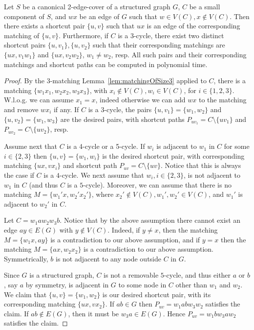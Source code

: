 \documentclass{article}
\begin{document}
\begin{lemma}\label{lem:shortcutPair}
    Let $S$ be a canonical 2-edge-cover of a structured graph $G$, $C$ be a small component of $S$, and $wx$ be an edge of $G$ such that $w\in V(C), x\notin V(C)$. Then there exists a shortcut pair $\{u, v\}$ such that $ux$ is an edge of the corresponding matching of $\{u, v\}$. Furthermore, if $C$ is a 3-cycle, there exist two distinct shortcut pairs $\{u, v_1\}, \{u, v_2\}$ such that their corresponding matchings are $\{ux, v_1w_1\}$ and $\{ux, v_2w_2\}$, $w_1\neq w_2$, resp. All such pairs and their corresponding matchings and shortcut paths can be computed in polynomial time.
\end{lemma}
\begin{proof}
    By the 3-matching Lemma~\ref{lem:matchingOfSize3} applied to $C$, there is a matching $\{w_1x_1, w_2x_2, w_3x_3\}$, with $x_i\notin V(C), w_i\in V(C)$, for $i\in\{1, 2, 3\}$. W.l.o.g. we can assume $x_1=x$, indeed otherwise we can add $wx$ to the matching and remove $wx_i$ if any. If $C$ is a 3-cycle, the pairs $\{u, v_1\}=\{w_1, w_2\}$ and $\{u, v_2\}=\{w_1, w_3\}$ are the desired pairs, with shortcut paths $P_{uv_1}=C\setminus\{uv_1\}$ and $P_{uv_2}=C\setminus\{uv_2\}$, resp. 
    
    Assume next that $C$ is a 4-cycle or a 5-cycle. If $w_i$ is adjacent to $w_1$ in $C$ for some $i\in\{2, 3\}$ then $\{u, v\}=\{w_1, w_i\}$ is the desired shortcut pair, with corresponding matching $\{ux, vx_i\}$ and shortcut path $P_{uv}=C\setminus\{uv\}$. Notice that this is always the case if $C$ is a $4$-cycle. We next assume that $w_i, i\in\{2, 3\}$, is not adjacent to $w_1$ in $C$ (and thus $C$ is a $5$-cycle). Moreover, we can assume that there is no matching $M = \{w_1'x, w_2'x_2'\}$, where $x_2'\notin V(C), w_1', w_2'\in V(C)$, and $w_1'$ is adjacent to $w_2'$ in $C$.
    
    Let $C=w_1aw_2w_3b$. Notice that by the above assumption there cannot exist an edge $ay\in E(G)$ with $y\notin V(C)$. Indeed, if $y\neq x$, then the matching $M = \{w_1x, ay\}$ is a contradiction to our above assumption, and if $y=x$ then the matching $M = \{ax, w_2x_2\}$ is a contradiction to our above assumption. Symmetrically, $b$ is not adjacent to any node outside $C$ in $G$.

    Since $G$ is a structured graph, $C$ is not a removable $5$-cycle, and thus either $a$ or $b$, say $a$ by symmetry, is adjacent in $G$ to some node in $C$ other than $w_1$ and $w_2$. We claim that $\{u, v\}=\{w_1, w_2\}$ is our desired shortcut pair, with its corresponding matching $\{ux, vx_2\}$. If $ab\in G$ then $P_{uv}=w_1abw_3w_2$ satisfies the claim. If $ab\notin E(G)$, then it must be $w_3a\in E(G)$. Hence  $P_{uv}=w_1bw_3aw_2$ satisfies the claim.
\end{proof}
\end{document}
